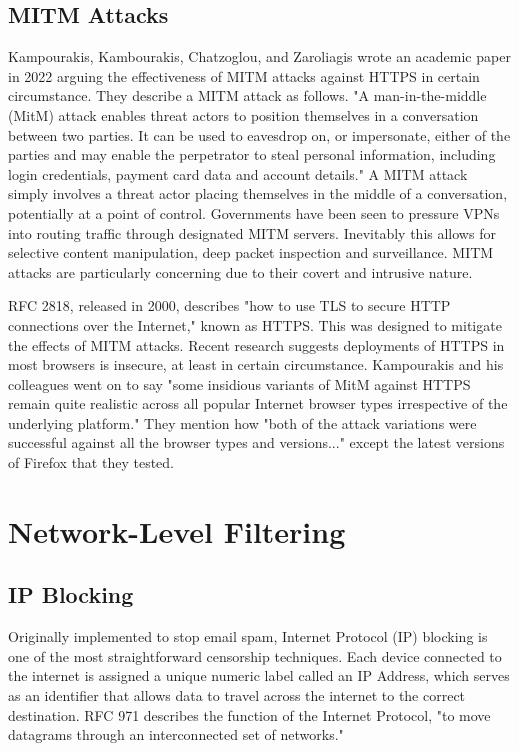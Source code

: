 \subsection{MITM Attacks}
Kampourakis, Kambourakis, Chatzoglou, and Zaroliagis wrote an academic paper in 2022 arguing the effectiveness of MITM attacks against HTTPS in certain circumstance. They describe a MITM attack as follows. "A man-in-the-middle (MitM) attack enables threat actors to position themselves in a conversation between two parties. It can be used to eavesdrop on, or impersonate, either of the parties and may enable the perpetrator to steal personal information, including login credentials, payment card data and account details."\cite{MITMvHTTPS} A MITM attack simply involves a threat actor placing themselves in the middle of a conversation, potentially at a point of control. Governments have been seen to pressure VPNs into routing traffic through designated MITM servers. Inevitably this allows for selective content manipulation, deep packet inspection and surveillance. MITM attacks are particularly concerning due to their covert and intrusive nature. 

RFC 2818, released in 2000, describes "how to use TLS to secure HTTP connections over the Internet," \cite{rfc2818}known as HTTPS. This was designed to mitigate the effects of MITM attacks. Recent research suggests deployments of HTTPS in most browsers is insecure, at least in certain circumstance. Kampourakis and his colleagues went on to say "some insidious variants of MitM against HTTPS remain quite realistic across all popular Internet browser types irrespective of the underlying platform." \cite{MITMvHTTPS} 
They mention how "both of the attack variations were successful against all the browser types and versions..." except the latest versions of Firefox that they tested.

\section{Network-Level Filtering}
\subsection{IP Blocking}
Originally implemented to stop email spam, Internet Protocol (IP) blocking is one of the most straightforward censorship techniques. Each device connected to the internet is assigned a unique numeric label called an IP Address, which serves as an identifier that allows data to travel across the internet to the correct destination. RFC 971 describes the function of the Internet Protocol, "to move datagrams through an interconnected set of networks." \cite{rfc791}

